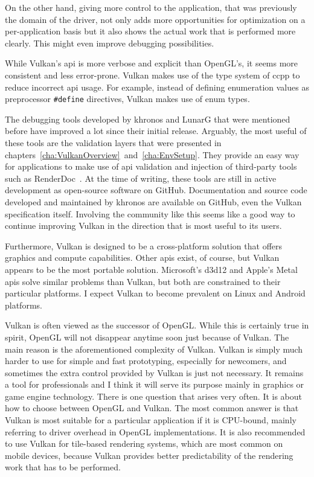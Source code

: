   On the other hand, giving more control to the application, that was previously the domain of the driver, not only adds more opportunities for optimization on a per-application basis but it also shows the actual work that is performed more clearly.
  This might even improve debugging possibilities.

  While Vulkan's \gls{api} is more verbose and explicit than OpenGL's, it seems more consistent and less error-prone.
  Vulkan makes use of the type system of \gls{ccpp} to reduce incorrect \gls{api} usage.
  For example, instead of defining enumeration values as preprocessor \lstinline{#define} directives, Vulkan makes use of enum types.

  The debugging tools developed by \gls{khronos} and LunarG that were mentioned before have improved a lot since their initial release.
  Arguably, the most useful of these tools are the validation layers that were presented in chapters~\ref{cha:VulkanOverview}~and~\ref{cha:EnvSetup}.
  They provide an easy way for applications to make use of \gls{api} validation and injection of third-party tools such as RenderDoc~\cite{renderdoc}.
  At the time of writing, these tools are still in active development as open-source software on GitHub.
  Documentation and source code developed and maintained by \gls{khronos} are available on GitHub, even the Vulkan specification itself.
  Involving the community like this seems like a good way to continue improving Vulkan in the direction that is most useful to its users.

  Furthermore, Vulkan is designed to be a cross-platform solution that offers graphics and compute capabilities.
  Other \glspl{api} exist, of course, but Vulkan appears to be the most portable solution.
  Microsoft's \gls{d3d12} and Apple's Metal \glspl{api} solve similar problems than Vulkan, but both are constrained to their particular platforms.
  I expect Vulkan to become prevalent on Linux and Android platforms.

  Vulkan is often viewed as the successor of OpenGL.
  While this is certainly true in spirit, OpenGL will not disappear anytime soon just because of Vulkan.
  The main reason is the aforementioned complexity of Vulkan.
  Vulkan is simply much harder to use for simple and fast prototyping, especially for newcomers, and sometimes the extra control provided by Vulkan is just not necessary.
  It remains a tool for professionals and I think it will serve its purpose mainly in graphics or game engine technology.
  There is one question that arises very often.
  It is about how to choose between OpenGL and Vulkan.
  The most common answer is that Vulkan is most suitable for a particular application if it is CPU-bound, mainly referring to driver overhead in OpenGL implementations.
  It is also recommended to use Vulkan for tile-based rendering systems, which are most common on mobile devices, because Vulkan provides better predictability of the rendering work that has to be performed.

